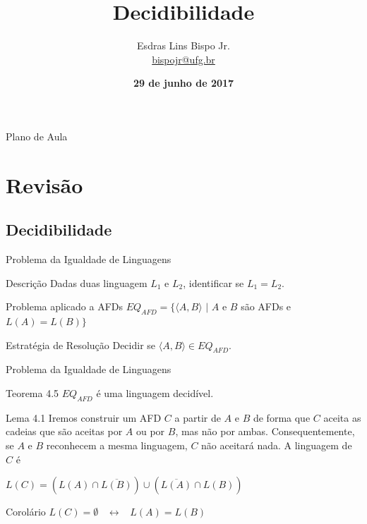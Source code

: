 \documentclass[xcolor=dvipsnames,table]{beamer}
\title{Decidibilidade}
\author{
  Esdras Lins Bispo Jr. \\ \url{bispojr@ufg.br}
  }
\institute{
  Teoria da Computação \\Bacharelado em Ciência da Computação}
\date{\textbf{29 de junho de 2017} }
\begin{document}
	\begin{frame}
		\titlepage
	\end{frame}

	\AtBeginSection{
		\begin{frame}{Sumário}%
    		\tableofcontents[currentsection]
		\end{frame}
	}

	\begin{frame}{Plano de Aula}
		\tableofcontents
	\end{frame}
    
    \section{Revisão}
    
	\subsection{Decidibilidade}
	
	\begin{frame}{Problema da Igualdade de Linguagens}
		\begin{block}{Descrição}
			Dadas duas linguagem $L_1$ e $L_2$, identificar se $L_1 = L_2$.
		\end{block}	 
		\begin{block}{Problema aplicado a AFDs}
			$EQ_{AFD} = \{ \langle A, B \rangle \mbox{ | } A$ e $B$ são AFDs e $L(A) = L(B) \}$
		\end{block}  
		\begin{block}{Estratégia de Resolução}
			Decidir se $\langle A, B \rangle \in EQ_{AFD}$.
		\end{block}
	\end{frame}		
	
	\begin{frame}{Problema da Igualdade de Linguagens}
		\begin{block}{Teorema 4.5}
			$EQ_{AFD}$ é uma linguagem decidível.
		\end{block}  
		\begin{block}{Lema 4.1}
			Iremos construir um AFD $C$ a partir de $A$ e $B$ de forma que $C$ aceita as cadeias que são aceitas por $A$ ou por $B$, mas não por ambas. Consequentemente, se $A$ e $B$ reconhecem a mesma linguagem, $C$ não aceitará nada. A linguagem de $C$ é
			\begin{center}
				$L(C) = \left( L(A) \cap \overline{L(B)} \right) \cup \left( \overline{L(A)} \cap L(B) \right)$
			\end{center}
		\end{block}  
		\begin{block}{Corolário}
			$L(C) = \emptyset$ \ $\leftrightarrow$ \ $L(A) = L(B)$
		\end{block}
	\end{frame}
	
\end{document}
